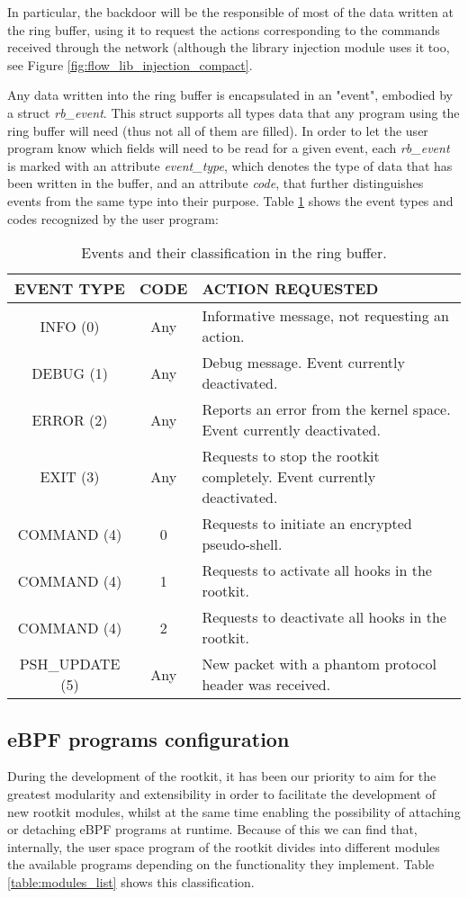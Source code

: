 In particular, the backdoor will be the responsible of most of the data written at the ring buffer, using it to request the actions corresponding to the commands received through the network (although the library injection module uses it too, see Figure \ref{fig:flow_lib_injection_compact}. 

Any data written into the ring buffer is encapsulated in an "event", embodied by a struct \textit{rb\_event}. This struct supports all types data that any program using the ring buffer will need (thus not all of them are filled). In order to let the user program know which fields will need to be read for a given event, each \textit{rb\_event} is marked with an attribute \textit{event\_type}, which denotes the type of data that has been written in the buffer, and an attribute \textit{code}, that further distinguishes events from the same type into their purpose. Table \ref{table:ring_buf_events} shows the event types and codes recognized by the user program:

\begin{table}[htbp]
\begin{tabular}{|c|c|>{\centering\arraybackslash}p{8cm}|}
\hline
\textbf{EVENT TYPE} & \textbf{CODE} & \textbf{ACTION REQUESTED} \\
\hline
\hline
INFO (0) & Any & Informative message, not requesting an action.\\
\hline
DEBUG (1) & Any & Debug message. Event currently deactivated.\\
\hline
ERROR (2) & Any & Reports an error from the kernel space. Event currently deactivated.\\
\hline
EXIT (3) & Any & Requests to stop the rootkit completely. Event currently deactivated.\\
\hline
COMMAND (4) & 0 & Requests to initiate an encrypted pseudo-shell.\\
\hline
COMMAND (4) & 1 & Requests to activate all hooks in the rootkit.\\
\hline
COMMAND (4) & 2 & Requests to deactivate all hooks in the rootkit.\\
\hline
PSH\_UPDATE (5) & Any & New packet with a phantom protocol header was received.\\
\hline
\end{tabular}
\caption{Events and their classification in the ring buffer.}
\label{table:ring_buf_events}
\end{table}


\subsection{eBPF programs configuration} \label{subsection:ebpf_progs_config}
During the development of the rootkit, it has been our priority to aim for the greatest modularity and extensibility in order to facilitate the development of new rootkit modules, whilst at the same time enabling the possibility of attaching or detaching eBPF programs at runtime. Because of this we can find that, internally, the user space program of the rootkit divides into different modules the available programs depending on the functionality they implement. Table \ref{table:modules_list} shows this classification.

